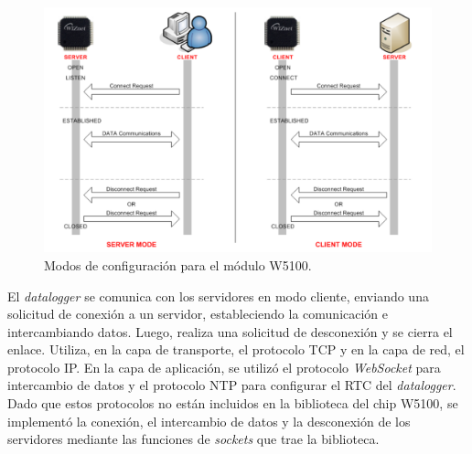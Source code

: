 \begin{figure}[H]
    \centering
    \includegraphics[width=0.9\linewidth]{Figuras/datalogger/Firmware/socketModoDeTrabajoW5100.png}
    \caption{Modos de configuración para el módulo W5100.}
    \label{fig:socketModoDeTrabajoW5100}
\end{figure}

El \textit{datalogger} se comunica con los servidores en modo cliente, enviando una solicitud de conexión a un servidor, estableciendo la comunicación e intercambiando datos. Luego, realiza una solicitud de desconexión y se cierra el enlace. Utiliza, en la capa de transporte, el protocolo TCP y en la capa de red, el protocolo IP. En la capa de aplicación, se utilizó el protocolo \textit{WebSocket} para intercambio de datos y el protocolo NTP para configurar el RTC del \textit{datalogger}. Dado que estos protocolos no están incluidos en la biblioteca del chip W5100, se implementó la conexión, el intercambio de datos y la desconexión de los servidores mediante las funciones de \textit{sockets} que trae la biblioteca.


